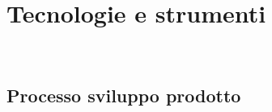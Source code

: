 
\chapter{Tecnologie e strumenti}
\label{cap:tecnologie_e_strumenti}

\\

\section{Processo sviluppo prodotto}
